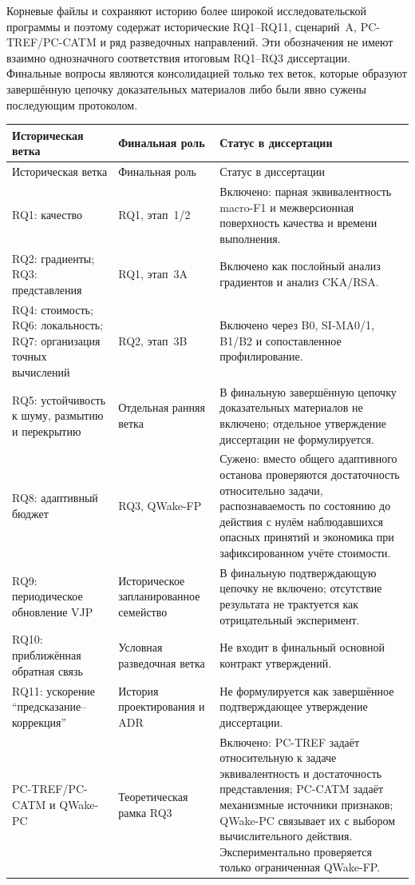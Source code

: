 Корневые файлы  и  сохраняют историю более
широкой исследовательской программы и поэтому содержат исторические RQ1--RQ11,
сценарий~A, PC-TREF/PC-CATM и ряд разведочных направлений. Эти обозначения не
имеют взаимно однозначного соответствия итоговым RQ1--RQ3 диссертации.
Финальные вопросы являются консолидацией только тех веток, которые образуют
завершённую цепочку доказательных материалов либо были явно сужены последующим
протоколом.

\begin{longtable}{@{}L{0.19\textwidth}L{0.31\textwidth}L{0.39\textwidth}@{}}
\toprule
Историческая ветка & Финальная роль & Статус в диссертации \\
\midrule
\endfirsthead
\toprule
Историческая ветка & Финальная роль & Статус в диссертации \\
\midrule
\endhead
RQ1: качество & RQ1, этап~1/2 & Включено: парная эквивалентность macro-F1 и межверсионная поверхность качества и времени выполнения. \\
RQ2: градиенты; RQ3: представления & RQ1, этап~3A & Включено как послойный анализ градиентов и анализ CKA/RSA. \\
RQ4: стоимость; RQ6: локальность; RQ7: организация точных вычислений & RQ2, этап~3B & Включено через B0, SI-MA0/1, B1/B2 и сопоставленное профилирование. \\
RQ5: устойчивость к шуму, размытию и перекрытию & Отдельная ранняя ветка & В финальную завершённую цепочку доказательных материалов не включено; отдельное утверждение диссертации не формулируется. \\
RQ8: адаптивный бюджет & RQ3, QWake-FP & Сужено: вместо общего адаптивного останова проверяются достаточность относительно задачи, распознаваемость по состоянию до действия с нулём наблюдавшихся опасных принятий и экономика при зафиксированном учёте стоимости. \\
RQ9: периодическое обновление VJP & Историческое запланированное семейство & В финальную подтверждающую цепочку не включено; отсутствие результата не трактуется как отрицательный эксперимент. \\
RQ10: приближённая обратная связь & Условная разведочная ветка & Не входит в финальный основной контракт утверждений. \\
RQ11: ускорение ``предсказание--коррекция'' & История проектирования и ADR & Не формулируется как завершённое подтверждающее утверждение диссертации. \\
PC-TREF/PC-CATM и QWake-PC & Теоретическая рамка RQ3 & Включено: PC-TREF задаёт относительную к задаче эквивалентность и достаточность представления; PC-CATM задаёт механизмные источники признаков; QWake-PC связывает их с выбором вычислительного действия. Экспериментально проверяется только ограниченная QWake-FP. \\
\bottomrule
\end{longtable}

